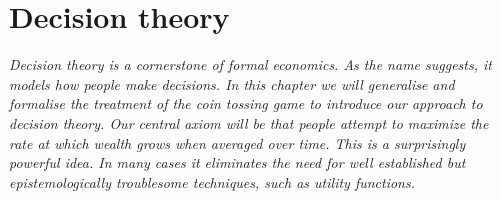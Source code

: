 \newpage


\section{Decision theory\label{sec:decision}}
%
%


{\it Decision theory is a cornerstone of formal economics. As the name suggests, it 
models how people make decisions. In this chapter we will generalise and formalise
the treatment of the coin tossing game to introduce our 
approach to decision theory. Our central axiom will be that people attempt to maximize
the rate at which wealth grows when averaged over time. This is a surprisingly powerful idea.
In many cases it eliminates the need for well established but epistemologically troublesome techniques, such as utility functions. 
}
\newpage

